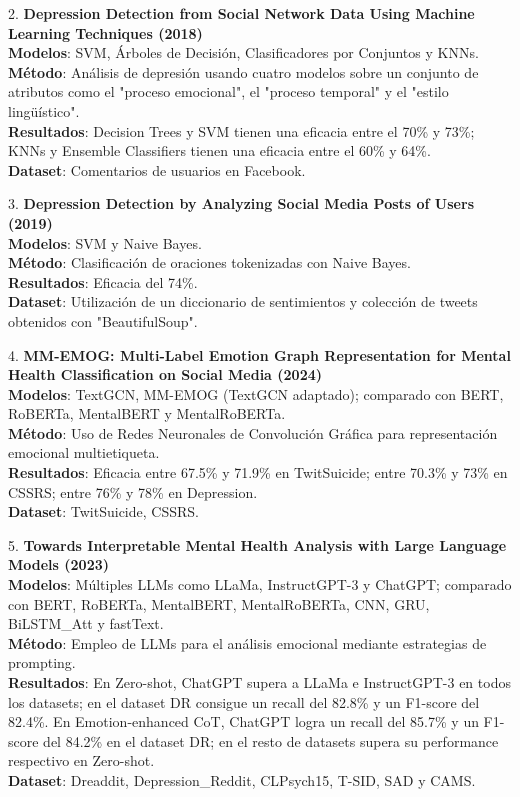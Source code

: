 \documentclass[
10pt, %
a4paper, %
oneside, %
headinclude,footinclude, %
BCOR5mm, %
]{scrartcl}
\begin{document}
2. \textbf{Depression Detection from Social Network Data Using Machine Learning Techniques (2018)} \\
   \textbf{Modelos}: SVM, Árboles de Decisión, Clasificadores por Conjuntos y KNNs. \\
   \textbf{Método}: Análisis de depresión usando cuatro modelos sobre un conjunto de atributos como el "proceso emocional", el "proceso temporal" y el "estilo lingüístico". \\
   \textbf{Resultados}: Decision Trees y SVM tienen una eficacia entre el 70\% y 73\%; KNNs y Ensemble Classifiers tienen una eficacia entre el 60\% y 64\%. \\
   \textbf{Dataset}: Comentarios de usuarios en Facebook.

3. \textbf{Depression Detection by Analyzing Social Media Posts of Users (2019)} \\
   \textbf{Modelos}: SVM y Naive Bayes. \\
   \textbf{Método}: Clasificación de oraciones tokenizadas con Naive Bayes. \\
   \textbf{Resultados}: Eficacia del 74\%. \\
   \textbf{Dataset}: Utilización de un diccionario de sentimientos y colección de tweets obtenidos con "BeautifulSoup".

4. \textbf{MM-EMOG: Multi-Label Emotion Graph Representation for Mental Health Classification on Social Media (2024)} \\
   \textbf{Modelos}: TextGCN, MM-EMOG (TextGCN adaptado); comparado con BERT, RoBERTa, MentalBERT y MentalRoBERTa. \\
   \textbf{Método}: Uso de Redes Neuronales de Convolución Gráfica para representación emocional multietiqueta. \\
   \textbf{Resultados}: Eficacia entre 67.5\% y 71.9\% en TwitSuicide; entre 70.3\% y 73\% en CSSRS; entre 76\% y 78\% en Depression. \\
   \textbf{Dataset}: TwitSuicide, CSSRS.

5. \textbf{Towards Interpretable Mental Health Analysis with Large Language Models (2023)} \\
   \textbf{Modelos}: Múltiples LLMs como LLaMa, InstructGPT-3 y ChatGPT; comparado con BERT, RoBERTa, MentalBERT, MentalRoBERTa, CNN, GRU, BiLSTM\_Att y fastText. \\
   \textbf{Método}: Empleo de LLMs para el análisis emocional mediante estrategias de prompting. \\
   \textbf{Resultados}: En Zero-shot, ChatGPT supera a LLaMa e InstructGPT-3 en todos los datasets; en el dataset DR consigue un recall del 82.8\% y un F1-score del 82.4\%. En Emotion-enhanced CoT, ChatGPT logra un recall del 85.7\% y un F1-score del 84.2\% en el dataset DR; en el resto de datasets supera su performance respectivo en Zero-shot. \\
   \textbf{Dataset}: Dreaddit, Depression\_Reddit, CLPsych15, T-SID, SAD y CAMS.
   
\end{document}
